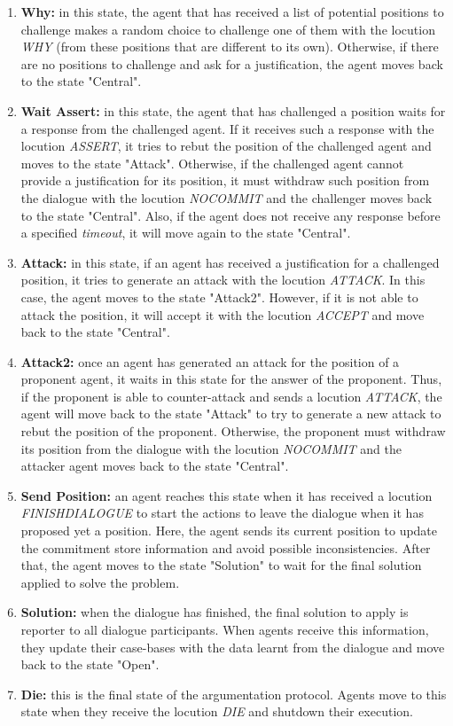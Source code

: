 \begin{enumerate}
 \item \textbf{Why:} in this state, the agent that has received a list of potential positions to challenge makes a random choice to challenge one of them with the locution \emph{WHY} (from these positions that are different to its own). Otherwise, if there are no positions to challenge and ask for a justification, the agent moves back to the state "Central".
 \item \textbf{Wait Assert:} in this state, the agent that has challenged a position waits for a response from the challenged agent. If it receives such a response with the locution \emph{ASSERT}, it tries to rebut the position of the challenged agent and moves to the state "Attack". Otherwise, if the challenged agent cannot provide a justification for its position, it must withdraw such position from the dialogue with the locution \emph{NOCOMMIT} and the challenger moves back to the state "Central". Also, if the agent does not receive any response before a specified \emph{timeout}, it will move again to the state "Central".
 \item \textbf{Attack:} in this state, if an agent has received a justification for a challenged position, it tries to generate an attack with the locution \emph{ATTACK}. In this case, the agent moves to the state "Attack2". However, if it is not able to attack the position, it will accept it with the locution \emph{ACCEPT} and move back to the state "Central".
 \item \textbf{Attack2:} once an agent has generated an attack for the position of a proponent agent, it waits in this state for the answer of the proponent. Thus, if the proponent is able to counter-attack and sends a locution \emph{ATTACK}, the agent will move back to the state "Attack" to try to generate a new attack to rebut the position of the proponent. Otherwise, the proponent must withdraw its position from the dialogue with the locution \emph{NOCOMMIT} and the attacker agent moves back to the state "Central".
 \item \textbf{Send Position:} an agent reaches this state when it has received a locution \emph{FINISHDIALOGUE} to start the actions to leave the dialogue when it has proposed yet a position. Here, the agent sends its current position to update the commitment store information and avoid possible inconsistencies. After that, the agent moves to the state "Solution" to wait for the final solution applied to solve the problem.
 \item \textbf{Solution:} when the dialogue has finished, the final solution to apply is reporter to all dialogue participants. When agents receive this information, they update their case-bases with the data learnt from the dialogue and move back to the state "Open".
 \item \textbf{Die:} this is the final state of the argumentation protocol. Agents move to this state when they receive the locution \emph{DIE} and shutdown their execution.
\end{enumerate}

